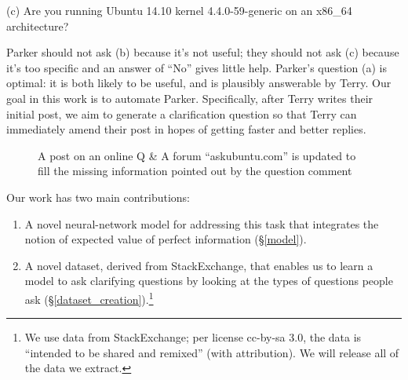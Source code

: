\documentclass[11pt,a4paper]{article}
\begin{document}
\textsf{\small(c) Are you running Ubuntu 14.10 kernel 4.4.0-59-generic on an x86\_64 architecture?}

\noindent
Parker should not ask (b) because it's not useful; they should not ask (c) because it's too specific and an answer of ``No'' gives little help.
Parker's question (a) is optimal: it is both likely to be useful, and is plausibly answerable by Terry.
Our goal in this work is to automate Parker.
Specifically, after Terry writes their initial post, we aim to generate a clarification question so that Terry can immediately amend their post in hopes of getting faster and better replies.
\begin{figure}[!t]
	\centering
	\setlength\fboxsep{1pt}
	\setlength\fboxrule{0.5pt}
	\caption{A post on an online Q \& A forum ``askubuntu.com'' is updated to fill the missing information pointed out by the question comment}
	\label{askubuntu_post}
\end{figure}
%

Our work has two main contributions: 
\begin{enumerate}
\item A novel neural-network model for addressing this task that integrates the notion of expected value of perfect information (\S\ref{model}). %
\item A novel dataset, derived from StackExchange, that enables us to learn a model to ask clarifying questions by looking at the types of questions people ask (\S\ref{dataset_creation}).\footnote{We use data from StackExchange; per license cc-by-sa 3.0, the data is ``intended to be shared and remixed'' (with attribution). We will release all of the data we extract.}
\end{enumerate}
\end{document}
